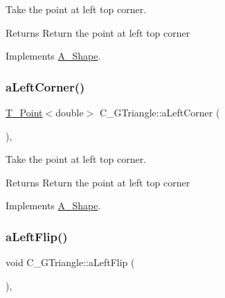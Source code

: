 Take the point at left top corner. 

\begin{DoxyReturn}{Returns}
Return the point at left top corner 
\end{DoxyReturn}


Implements \hyperlink{classA__Shape_abe6781b13037bf7ecea8ff9456b31533}{A\+\_\+\+Shape}.

\mbox{\label{classC__GTriangle_a527bdcfbcba0747c0d16d0472d0b15d8}} 
\subsubsection{\texorpdfstring{a\+Left\+Corner()}{aLeftCorner()}\hspace{0.1cm}{\footnotesize\ttfamily [2/2]}}
{\footnotesize\ttfamily \hyperlink{classT__Point}{T\+\_\+\+Point}$<$double$>$ C\+\_\+\+G\+Triangle\+::a\+Left\+Corner (\begin{DoxyParamCaption}{ }\end{DoxyParamCaption})\hspace{0.3cm}{\ttfamily [override]}, {\ttfamily [virtual]}}



Take the point at left top corner. 

\begin{DoxyReturn}{Returns}
Return the point at left top corner 
\end{DoxyReturn}


Implements \hyperlink{classA__Shape_abe6781b13037bf7ecea8ff9456b31533}{A\+\_\+\+Shape}.

\mbox{\label{classC__GTriangle_a9ffdddb586b42757ffca6a9ca0c20934}} 
\subsubsection{\texorpdfstring{a\+Left\+Flip()}{aLeftFlip()}\hspace{0.1cm}{\footnotesize\ttfamily [1/2]}}
{\footnotesize\ttfamily void C\+\_\+\+G\+Triangle\+::a\+Left\+Flip (\begin{DoxyParamCaption}{ }\end{DoxyParamCaption})\hspace{0.3cm}{\ttfamily [override]}, {\ttfamily [virtual]}}




